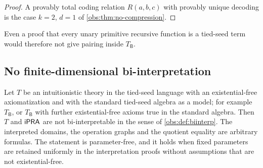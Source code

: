 \begin{proof}
A provably total coding relation $R(a,b,c)$ with provably unique decoding is
the case $k=2$, $d=1$ of \cref{obs:thm:no-compression}.
\end{proof}

Even a proof that every unary primitive recursive function is a tied-seed term
would therefore not give pairing inside $T_{\mathsf{B}}$.

\subsection{No finite-dimensional bi-interpretation}

\begin{theorem}
\label{obs:thm:no-biinterp}
Let $T$ be an intuitionistic theory in the tied-seed language with an
existential-free axiomatization and with the standard tied-seed algebra as a
model; for example $T_{\mathsf{B}}$, or $T_{\mathsf{B}}$ with further
existential-free axioms true in the standard algebra. Then $T$ and $\mathsf{iPRA}$ are
not bi-interpretable in the sense of \cref{obs:def:biinterp}. The interpreted
domains, the operation graphs and the quotient equality are arbitrary
formulas. The statement is parameter-free, and it holds when fixed parameters
are retained uniformly in the interpretation proofs without assumptions that
are not existential-free.
\end{theorem}

